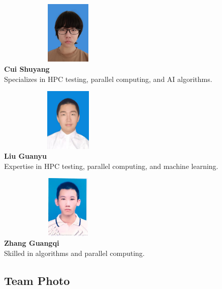 \documentclass[a4paper,12pt]{article}
\begin{document}
\begin{table}[H]
\begin{center}
\begin{minipage}{0.45\textwidth}
    \centering
    \includegraphics[width=0.5\textwidth, height=3cm, keepaspectratio]{Cui_Shuyang.png}\\[0.3cm]
    \textbf{Cui Shuyang}\\[0.3cm]
    \small{Specializes in HPC testing, parallel computing, and AI algorithms.}
\end{minipage}
\begin{minipage}{0.45\textwidth}
    \centering
    \includegraphics[width=0.5\textwidth, height=3cm, keepaspectratio]{Liu_Guanyu.jpg}\\[0.3cm]
    \textbf{Liu Guanyu}\\[0.3cm]
    \small{Expertise in HPC testing, parallel computing, and machine learning.}
\end{minipage}

\vspace{1cm}

\begin{minipage}{0.45\textwidth}
    \centering
    \includegraphics[width=0.5\textwidth, height=3cm, keepaspectratio]{Zhang_Guangqi.jpg}\\[0.3cm]
    \textbf{Zhang Guangqi}\\[0.3cm]
    \small{Skilled in algorithms and parallel computing.}
\end{minipage}
\end{center}
\end{table}

\subsection{Team Photo}
\end{document}
